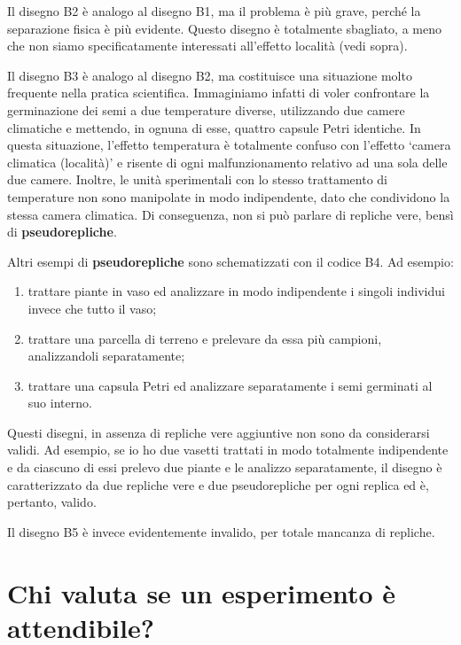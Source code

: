 \documentclass[
  12pt,
]{book}
\providecommand{\tightlist}{%
  \setlength{\itemsep}{0pt}\setlength{\parskip}{0pt}}
\begin{document}
Il disegno B2 è analogo al disegno B1, ma il problema è più grave, perché la separazione fisica è più evidente. Questo disegno è totalmente sbagliato, a meno che non siamo specificatamente interessati all'effetto località (vedi sopra).

Il disegno B3 è analogo al disegno B2, ma costituisce una situazione molto frequente nella pratica scientifica. Immaginiamo infatti di voler confrontare la germinazione dei semi a due temperature diverse, utilizzando due camere climatiche e mettendo, in ognuna di esse, quattro capsule Petri identiche. In questa situazione, l'effetto temperatura è totalmente confuso con l'effetto `camera climatica (località)' e risente di ogni malfunzionamento relativo ad una sola delle due camere. Inoltre, le unità sperimentali con lo stesso trattamento di temperature non sono manipolate in modo indipendente, dato che condividono la stessa camera climatica. Di conseguenza, non si può parlare di repliche vere, bensì di \textbf{pseudorepliche}.

Altri esempi di \textbf{pseudorepliche} sono schematizzati con il codice B4. Ad esempio:

\begin{enumerate}
\def\labelenumi{\arabic{enumi}.}
\tightlist
\item
  trattare piante in vaso ed analizzare in modo indipendente i singoli individui invece che tutto il vaso;
\item
  trattare una parcella di terreno e prelevare da essa più campioni, analizzandoli separatamente;
\item
  trattare una capsula Petri ed analizzare separatamente i semi germinati al suo interno.
\end{enumerate}

Questi disegni, in assenza di repliche vere aggiuntive non sono da considerarsi validi. Ad esempio, se io ho due vasetti trattati in modo totalmente indipendente e da ciascuno di essi prelevo due piante e le analizzo separatamente, il disegno è caratterizzato da due repliche vere e due pseudorepliche per ogni replica ed è, pertanto, valido.

Il disegno B5 è invece evidentemente invalido, per totale mancanza di repliche.

\hypertarget{chi-valuta-se-un-esperimento-uxe8-attendibile}{%
\section{Chi valuta se un esperimento è attendibile?}\label{chi-valuta-se-un-esperimento-uxe8-attendibile}}
\end{document}
